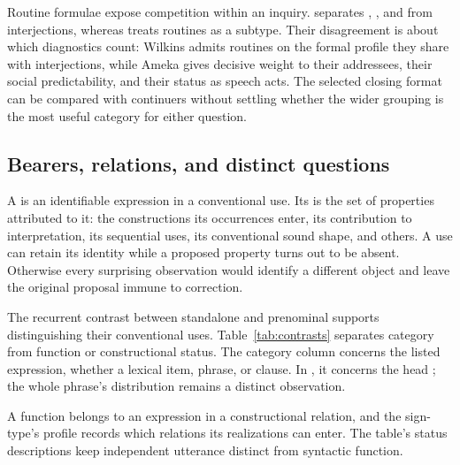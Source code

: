\documentclass[12pt]{article}
\begin{document}
Routine formulae expose competition within an inquiry.
\textcite[108--110]{ameka1992} separates , ,
and  from interjections, whereas
\textcite[142]{wilkins1992} treats routines as a subtype. Their
disagreement is about which diagnostics count: Wilkins admits routines on
the formal profile they share with interjections, while Ameka gives
decisive weight to their addressees, their social predictability, and their
status as speech acts. The selected closing format can be
compared with continuers without settling whether the wider grouping
is the most useful category for either question.

\subsection{Bearers, relations, and distinct questions}

A  is an identifiable expression in a conventional use.
Its  is the set of properties attributed to it: the
constructions its occurrences enter, its contribution to interpretation,
its sequential uses, its conventional sound shape, and others. A use can retain its identity
while a proposed property turns out to be absent. Otherwise every
surprising observation would identify a different object and leave the
original proposal immune to correction.

The recurrent contrast between standalone and prenominal 
supports distinguishing their conventional uses. Table~\ref{tab:contrasts}
separates category from function or constructional status. The category
column concerns the listed expression, whether a lexical item, phrase,
or clause. In , it concerns the head ;
the whole phrase's distribution remains a distinct observation.

A function belongs to an expression in a constructional relation, and
the sign-type's profile records which relations its realizations can
enter. The table's status descriptions keep independent utterance distinct
from syntactic function.
\end{document}
